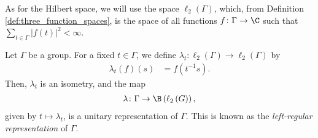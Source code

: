As for the Hilbert space, we will use the space $\ell_2\left( \Gamma \right)$, which, from Definition \ref{def:three_function_spaces}, is the space of all functions $f\colon \Gamma\rightarrow \C$ such that $\sum_{t\in \Gamma}\left\vert f(t) \right\vert^2 < \infty$.
\begin{theorem}\label{thm:left_regular_representation}
  Let $\Gamma$ be a group. For a fixed $t\in\Gamma$, we define $\lambda_t\colon \ell_2\left( \Gamma \right)\rightarrow \ell_2\left( \Gamma \right)$ by
  \begin{align*}
    \lambda_t\left( f \right)\left( s \right) &= f\left( t^{-1}s \right).
  \end{align*}
  Then, $\lambda_t$ is an isometry, and the map
  \begin{align*}
    \lambda\colon \Gamma\rightarrow \B\left( \ell_2\left( G \right) \right),
  \end{align*}
  given by $t\mapsto \lambda_t$, is a unitary representation of $\Gamma$. This is known as the \textit{left-regular representation} of $\Gamma$.
\end{theorem}
